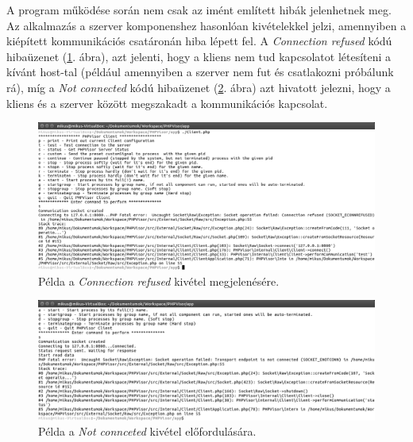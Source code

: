 \documentclass[12pt]{report}
\begin{document}
  A program működése során nem csak az imént említett hibák jelenhetnek meg. Az alkalmazás a szerver komponenshez hasonlóan kivételekkel jelzi, amennyiben a kiépített kommunikációs csatáronán hiba lépett fel. 
  A \textit{Connection refused} kódú hibaüzenet (\ref{fig:connref}. ábra), azt jelenti, hogy a kliens nem tud kapcsolatot létesíteni a kívánt host-tal (például amennyiben a szerver nem fut és csatlakozni próbálunk rá), míg a \textit{Not connected} kódú hibaüzenet (\ref{fig:notconn}. ábra) azt hivatott jelezni, hogy a kliens és a szerver között megszakadt a kommunikációs kapcsolat.
  
 \begin{figure}[ht]
  \centering
  \includegraphics[width=15cm]{pics/connref.png}
	  \caption{Példa a \textit{Connection refused} kivétel megjelenésére.}
      \label{fig:connref}
  \end{figure}

   \begin{figure}[ht]
  \centering
    \includegraphics[width=15cm]{pics/notconn.png}
	  \caption{Példa a \textit{Not connceted} kivétel előfordulására.}
      \label{fig:notconn}
  \end{figure}
  
\end{document}
